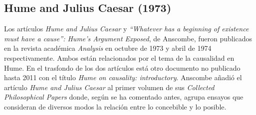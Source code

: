 \subsection{Hume and Julius Caesar (1973)}

Los artículos \emph{Hume and Julius Caesar} y \emph{``Whatever has a beginning of existence must have a cause'': Hume’s Argument Exposed}, de Anscombe, fueron publicados en la revista académica \emph{Analysis} en octubre de 1973 y abril de 1974 respectivamente. Ambos están relacionados por el tema de la causalidad en Hume. En el trasfondo de los dos artículos está otro documento no publicado hasta 2011 con el título \emph{Hume on causality: introductory}. Anscombe añadió el artículo \emph{Hume and Julius Caesar} al primer volumen de sus \emph{Collected Philosophical Papers} donde, según se ha comentado antes, agrupa ensayos que consideran de diversos modos la relación entre lo concebible y lo posible.

